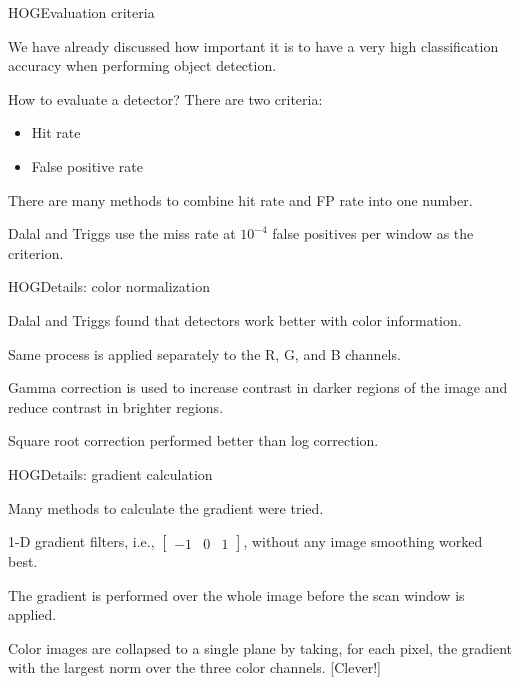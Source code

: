 \documentclass[aspectratio=169]{beamer}
\begin{document}
\begin{frame}{HOG}{Evaluation criteria}

  We have already discussed how important it is to have a very high
  classification accuracy when performing object detection.

  \medskip
  
  How to evaluate a detector? There are two criteria:
  \begin{itemize}
  \item Hit rate
  \item False positive rate
  \end{itemize}

  \medskip

  There are many methods to combine hit rate and FP rate into one number.
  
  \medskip

  Dalal and Triggs use the \alert{miss rate at $10^{-4}$ false
    positives per window} as the criterion.
  
\end{frame}


\begin{frame}{HOG}{Details: color normalization}

  Dalal and Triggs found that detectors work better with color information.

  \medskip

  Same process is applied separately to the R, G, and B channels.

  \medskip

  Gamma correction is used to increase contrast in darker regions of the
  image and reduce contrast in brighter regions.

  \medskip

  Square root correction
  performed better than log correction.

\end{frame}


\begin{frame}{HOG}{Details: gradient calculation}

  Many methods to calculate the gradient were tried.

  \medskip

  1-D gradient filters, i.e., $\begin{bmatrix} -1 & 0 & 1 \end{bmatrix}$,
  without any image smoothing worked best.

  \medskip

  The gradient is performed over the whole image before the scan
  window is applied.

  \medskip

  Color images are collapsed to a single plane by taking, for each
  pixel, the gradient with the largest norm over the three color
  channels. [Clever!]
  
\end{frame}
\end{document}

